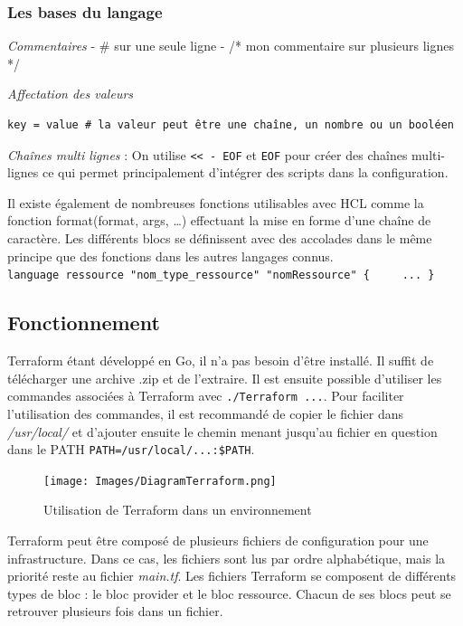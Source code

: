 \documentclass[]{article}
\begin{document}
\subsubsection{Les bases du langage}\label{les-bases-du-langage}
\emph{Commentaires} - \# sur une seule ligne - /* mon commentaire sur
plusieurs lignes */

\emph{Affectation des valeurs}
\begin{verbatim}
key = value # la valeur peut être une chaîne, un nombre ou un booléen
\end{verbatim}

\emph{Chaînes multi lignes} : On utilise
\texttt{\textless{}\textless{}\ -\ EOF} et \texttt{EOF} pour créer des
chaînes multi-lignes ce qui permet principalement d'intégrer des scripts
dans la configuration.

Il existe également de nombreuses fonctions utilisables avec HCL comme
la fonction format(format, args, \ldots{}) effectuant la mise en forme d'une chaîne de caractère.
Les différents blocs se définissent avec des accolades dans le même
principe que des fonctions dans les autres langages connus.
\texttt{language\ ressource\ "nom\_type\_ressource"\ "nomRessource"\ \{\ \ \ \ \ ...\ \}}

\subsection{Fonctionnement}\label{fonctionnement}
Terraform étant développé en Go, il n'a pas besoin d'être installé. Il
suffit de télécharger une archive .zip et de l'extraire. Il est ensuite
possible d'utiliser les commandes associées à Terraform avec
\texttt{./Terraform\ ...}. Pour faciliter l'utilisation des commandes,
il est recommandé de copier le fichier dans \emph{/usr/local/} et
d'ajouter ensuite le chemin menant jusqu'au fichier en question dans le
PATH \texttt{PATH=/usr/local/...:\$PATH}.

\begin{figure}
\centering
\texttt{[image: Images/DiagramTerraform.png]}
\caption{Utilisation de Terraform dans un environnement}
\end{figure}

Terraform peut être composé de plusieurs fichiers de configuration pour
une infrastructure. Dans ce cas, les fichiers sont lus par ordre
alphabétique, mais la priorité reste au fichier \emph{main.tf}.
Les fichiers Terraform se composent de différents types de bloc : le bloc
provider et le bloc ressource. Chacun de ses blocs peut se retrouver
plusieurs fois dans un fichier.
\end{document}
